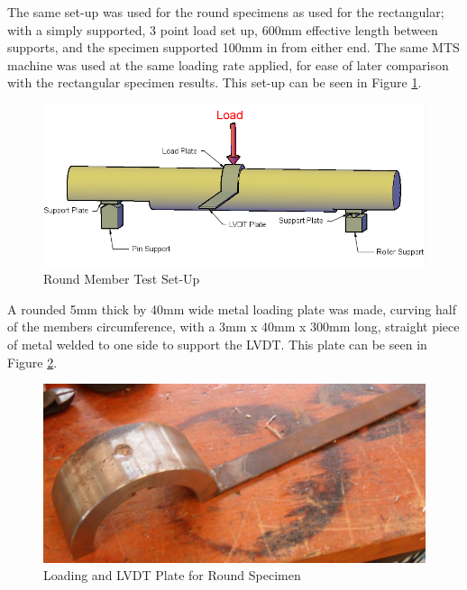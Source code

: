 \documentclass[11pt,a4paper]{article}
\numberwithin{equation}{subsection}
\begin{document}
\vspace*{\baselineskip}

\noindent
The same set-up was used for the round specimens as used for the rectangular; with a simply supported, 3 point load set up, 600mm effective length between supports, and the specimen supported 100mm in from either end. The same MTS machine was used at the same loading rate applied, for ease of later comparison with the rectangular specimen results. This set-up can be seen in Figure \ref{fig:round}.


\begin{figure}[h]
	\begin{center}
		\includegraphics[scale=0.55]{Circular_Setup}
	\end{center}
	\caption{Round Member Test Set-Up}
	\label{fig:round}
\end{figure}
\pagebreak

\noindent
A rounded 5mm thick by 40mm wide metal loading plate was made, curving half of the members circumference, with a 3mm x 40mm x 300mm long, straight piece of metal welded to one side to support the LVDT. This plate can be seen in Figure \ref{fig:RoundPlate}. 
\vspace*{\baselineskip}
\begin{figure}[h]
	\begin{center}
		\includegraphics[scale=0.1]{Round_Plate}
	\end{center}
	\caption{Loading and LVDT Plate for Round Specimen}
	\label{fig:RoundPlate}
\end{figure}
\end{document}
